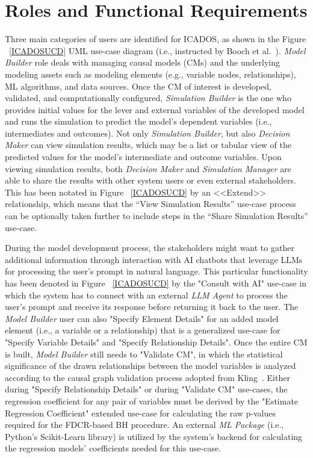 \documentclass{sfuthesis}
\begin{document}
\section{Roles and Functional Requirements}
Three main categories of users are identified for ICADOS, as shown in the Figure ~\ref{ICADOSUCD} UML use-case diagram (i.e., instructed by Booch et al.~\cite{booch1997uml}). \textit{Model Builder} role deals with managing causal models (CMs) and the underlying modeling assets such as modeling elements (e.g., variable nodes, relationships), ML algorithms, and data sources. Once the CM of interest is developed, validated, and computationally configured, \textit{Simulation Builder} is the one who provides initial values for the lever and external variables of the developed model and runs the simulation to predict the model's dependent variables (i.e., intermediates and outcomes). Not only \textit{Simulation Builder}, but also \textit{Decision Maker} can view simulation results, which may be a list or tabular view of the predicted values for the model's intermediate and outcome variables. Upon viewing simulation results, both \textit{Decision Maker} and \textit{Simulation Manager} are able to share the results with other system users or even external stakeholders. This has been notated in Figure ~\ref{ICADOSUCD} by an <<Extend>> relationship, which means that the “View Simulation Results” use-case process can be optionally taken further to include steps in the “Share Simulation Results” use-case.\par
During the model development process, the stakeholders might want to gather additional information through interaction with AI chatbots that leverage LLMs for processing the user's prompt in natural language. This particular functionality has been denoted in Figure ~\ref{ICADOSUCD} by the "Consult with AI" use-case in which the system has to connect with an external \textit{LLM Agent} to process the user's prompt and receive its response before returning it back to the user. The \textit{Model Builder} user can also "Specify Element Details" for an added model element (i.e., a variable or a relationship) that is a generalized use-case for "Specify Variable Details" and "Specify Relationship Details". Once the entire CM is built, \textit{Model Builder} still needs to "Validate CM", in which the statistical significance of the drawn relationships between the model variables is analyzed according to the causal graph validation process adopted from Kling~\cite{kling2025co}. Either during "Specify Relationship Details" or during "Validate CM" use-cases, the regression coefficient for any pair of variables must be derived by the "Estimate Regression Coefficient" extended use-case for calculating the raw p-values required for the FDCR-based BH procedure. An external \textit{ML Package} (i.e., Python's Scikit-Learn library) is utilized by the system's backend for calculating the regression models' coefficients needed for this use-case.\par
\end{document}
